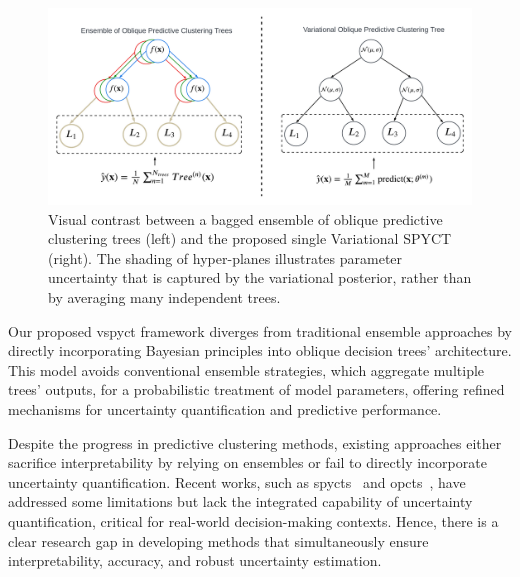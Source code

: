 \documentclass[3p,review,authoryear]{elsarticle}
\begin{document}
\begin{figure}[h!]
    \centering
    \includegraphics[width=1.0\textwidth]{main_flowchart.pdf}
    \caption{Visual contrast between a bagged ensemble of oblique predictive clustering trees (left) and the proposed single Variational SPYCT (right). The shading of hyper-planes illustrates parameter uncertainty that is captured by the variational posterior, rather than by averaging many independent trees.}
    \label{fig:main_flowchart}
\end{figure}

Our proposed \gls{vspyct} framework diverges from traditional ensemble approaches by directly incorporating Bayesian principles into oblique decision trees' architecture.
This model avoids conventional ensemble strategies, which aggregate multiple trees' outputs, for a probabilistic treatment of model parameters, offering refined mechanisms for uncertainty quantification and predictive performance.

Despite the progress in predictive clustering methods, existing approaches either sacrifice interpretability by relying on ensembles or fail to directly incorporate uncertainty quantification.
Recent works, such as \glspl{spyct}~\citep{Stepi_nik_2021} and \glspl{opct}~\citep{Stepisnik_2020}, have addressed some limitations but lack the integrated capability of uncertainty quantification, critical for real-world decision-making contexts.
Hence, there is a clear research gap in developing methods that simultaneously ensure interpretability, accuracy, and robust uncertainty estimation.

\end{document}
